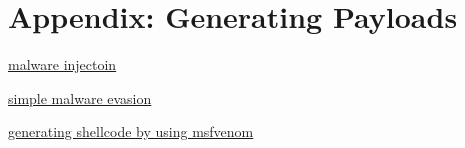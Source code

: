 \section*{Appendix: Generating Payloads}

\href{https://cocomelonc.github.io/tutorial/2021/09/18/malware-injection-1.html}{malware injectoin}

\href{https://cocomelonc.github.io/tutorial/2021/09/04/simple-malware-av-evasion.html}{simple malware evasion}

\href{https://stackoverflow.com/questions/42289112/generate-shellcode-by-using-msfvenom}{generating shellcode by using msfvenom}

